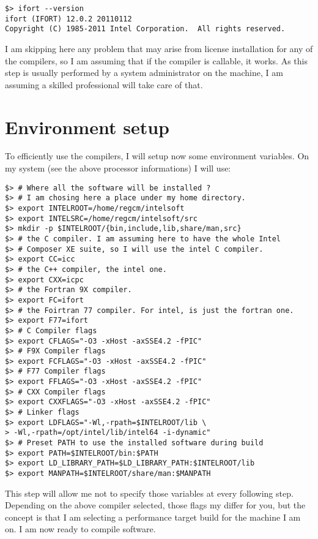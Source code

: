 \begin{Verbatim}
$> ifort --version
ifort (IFORT) 12.0.2 20110112
Copyright (C) 1985-2011 Intel Corporation.  All rights reserved.

\end{Verbatim}

I am skipping here any problem that may arise from license installation for any
of the compilers, so I am assuming that if the compiler is callable, it works.
As this step is usually performed by a system administrator on the machine,
I am assuming a skilled professional will take care of that.

\section{Environment setup}

To efficiently use the compilers, I will setup now some environment variables.
On my system (see the above processor informations) I will use:

\begin{Verbatim}
$> # Where all the software will be installed ?
$> # I am chosing here a place under my home directory.
$> export INTELROOT=/home/regcm/intelsoft
$> export INTELSRC=/home/regcm/intelsoft/src
$> mkdir -p $INTELROOT/{bin,include,lib,share/man,src}
$> # the C compiler. I am assuming here to have the whole Intel
$> # Composer XE suite, so I will use the intel C compiler.
$> export CC=icc
$> # the C++ compiler, the intel one.
$> export CXX=icpc
$> # the Fortran 9X compiler.
$> export FC=ifort
$> # the Foirtran 77 compiler. For intel, is just the fortran one.
$> export F77=ifort
$> # C Compiler flags
$> export CFLAGS="-O3 -xHost -axSSE4.2 -fPIC"
$> # F9X Compiler flags
$> export FCFLAGS="-O3 -xHost -axSSE4.2 -fPIC"
$> # F77 Compiler flags
$> export FFLAGS="-O3 -xHost -axSSE4.2 -fPIC"
$> # CXX Compiler flags
$> export CXXFLAGS="-O3 -xHost -axSSE4.2 -fPIC"
$> # Linker flags
$> export LDFLAGS="-Wl,-rpath=$INTELROOT/lib \
> -Wl,-rpath=/opt/intel/lib/intel64 -i-dynamic"
$> # Preset PATH to use the installed software during build
$> export PATH=$INTELROOT/bin:$PATH
$> export LD_LIBRARY_PATH=$LD_LIBRARY_PATH:$INTELROOT/lib
$> export MANPATH=$INTELROOT/share/man:$MANPATH
\end{Verbatim}

This step will allow me not to specify those variables at every following step.
Depending on the above compiler selected, those flags my differ for you, but the
concept is that I am selecting a performance target build for the machine I am
on. I am now ready to compile software.

